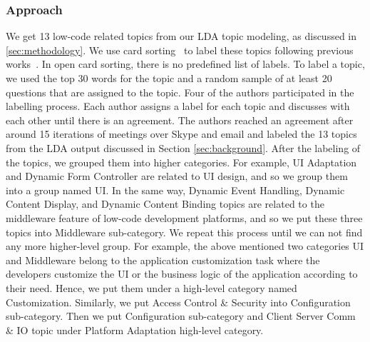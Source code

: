 \subsubsection{Approach}
We get 13 low-code related topics from our LDA topic modeling, as discussed in \sec\ref{sec:methodology}. We use card sorting~\cite{fincher2005making} to label these topics  following previous
works~\cite{bagherzadeh2019going, ahmed2018concurrency, yang2016security, rosen2016mobile, abdellatif2020challenges}.
In open card sorting, there is no predefined list of labels. To label a topic, 
we used the top 30 words for the topic and a random sample of at least 20 questions that are assigned to the topic. Four of the authors participated in the labelling process.
Each author assigns a label for each topic and discusses with each other until
there is an agreement. The authors reached an agreement after around 15
iterations of meetings over Skype and email and labeled the 13 topics from the
LDA output discussed in Section \ref{sec:background}. After the labeling of the topics, we grouped them into higher categories. For
example, UI Adaptation and Dynamic Form Controller are related to UI design, and
so we group them into a group named UI. In the same way, Dynamic Event Handling,
Dynamic Content Display, and Dynamic Content Binding topics are related to the
middleware feature of low-code development platforms, and so we put these three
topics into Middleware sub-category. We repeat this process until we can not
find any more higher-level group. For example, the above mentioned two
categories UI and Middleware belong to the application customization task where
the developers customize the UI or the business logic of the application
according to their need. Hence, we put them under a high-level category named
Customization. Similarly, we put Access Control \& Security into Configuration sub-category. Then we put Configuration sub-category and Client Server Comm \& IO topic under Platform Adaptation high-level category.



